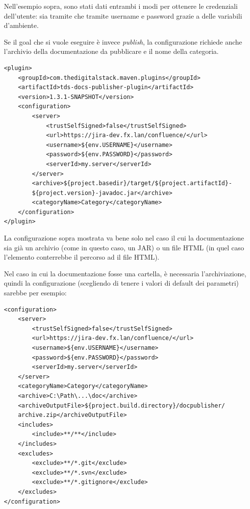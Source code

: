 Nell'esempio sopra, sono stati dati entrambi i modi per ottenere le credenziali dell'utente: sia tramite  che tramite username e password grazie a delle variabili d'ambiente.

Se il goal che si vuole eseguire è invece \emph{publish}, la configurazione richiede anche l'archivio della documentazione da pubblicare e il nome della categoria.

\clearpage

\begin{lstlisting}
<plugin>
    <groupId>com.thedigitalstack.maven.plugins</groupId>
    <artifactId>tds-docs-publisher-plugin</artifactId>
    <version>1.3.1-SNAPSHOT</version>
    <configuration>
        <server>
            <trustSelfSigned>false</trustSelfSigned>
            <url>https://jira-dev.fx.lan/confluence/</url>
            <username>${env.USERNAME}</username>
            <password>${env.PASSWORD}</password>
            <serverId>my.server</serverId>
        </server>
        <archive>${project.basedir}/target/${project.artifactId}-
        ${project.version}-javadoc.jar</archive>
        <categoryName>Category</categoryName>
    </configuration>
</plugin>
\end{lstlisting}

La configurazione sopra mostrata va bene solo nel caso il cui la documentazione sia già un archivio (come in questo caso, un JAR) o un file HTML (in quel caso l'elemento  conterrebbe il percorso ad il file HTML).

Nel caso in cui la documentazione fosse una cartella, è necessaria l'archiviazione, quindi la configurazione (scegliendo di tenere i valori di default dei parametri) sarebbe per esempio:

\begin{lstlisting}
<configuration>
    <server>
        <trustSelfSigned>false</trustSelfSigned>
        <url>https://jira-dev.fx.lan/confluence/</url>
        <username>${env.USERNAME}</username>
        <password>${env.PASSWORD}</password>
        <serverId>my.server</serverId>
    </server>
    <categoryName>Category</categoryName>
    <archive>C:\Path\...\doc</archive>
    <archiveOutputFile>${project.build.directory}/docpublisher/
    archive.zip</archiveOutputFile>   
    <includes>   
        <include>**/**</include>
    </includes>
    <excludes>
        <exclude>**/*.git</exclude>
        <exclude>**/*.svn</exclude>
        <exclude>**/*.gitignore</exclude>
    </excludes>
</configuration>
\end{lstlisting}

